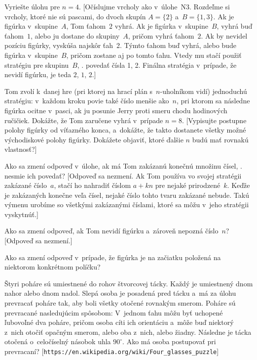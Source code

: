 {Vyriešte úlohu pre $n = 4$. [Očíslujme vrcholy ako
v~úlohe~N3. Rozdeľme si vrcholy, ktoré nie sú pascami, do dvoch skupín $A= \{2\}$
a~$B = \{1, 3\}$. Ak je figúrka v~skupine~$A$, Tom ťahom~$2$ vyhrá.
Ak je figúrka v~skupine~$B$, vyhrá buď ťahom~$1$, alebo ju
dostane do skupiny~$A$, pričom vyhrá ťahom~$2$. Ak by nevidel pozíciu
figúrky, vyskúša najskôr ťah~2. Týmto ťahom buď vyhrá, alebo
bude figúrka v~skupine~$B$, pričom zostane aj po tomto ťahu. Vtedy mu
stačí použiť stratégiu pre skupinu~$B$, \tj. povedať čísla
1, 2. Finálna stratégia v~prípade, že nevidí figúrku, je teda
$2$, $1$, $2$.]

Tom zvolí k~danej hre (pri ktorej na hrací plán s~$n$-uholníkom vidí)
jednoduchú stratégiu: v~každom kroku povie také číslo menšie ako~$n$,
pri ktorom sa následne figúrka ocitne v~pasci, ak ju posunie Jerry proti
smeru chodu hodinových ručičiek. Dokážte, že Tom zaručene vyhrá v~prípade $n=8$.
[Vypisujte postupne polohy figúrky
od víťazného konca,
a~dokážte, že takto dostanete všetky možné východiskové polohy figúrky.
Dokážete objaviť, ktoré ďalšie $n$ budú mať rovnakú vlastnosť?]

\D
Ako sa zmení odpoveď v~úlohe, ak má Tom zakázanú
konečnú množinu čísel, \tj. nesmie ich povedať? [Odpoveď sa
nezmení. Ak Tom používa vo svojej stratégii zakázané číslo~$a$,
stačí ho nahradiť číslom $a+kn$ pre nejaké prirodzené~$k$.
Keďže je zakázaných konečne veľa čísel, nejaké číslo
tohto tvaru zakázané nebude. Takú výmenu urobíme so všetkými
zakázanými číslami, ktoré sa môžu v~jeho stratégii vyskytnúť.]

Ako sa zmení odpoveď, ak Tom nevidí figúrku
a~zároveň nepozná číslo~$n$? [Odpoveď sa nezmení.]

Ako sa zmení odpoveď v~prípade, že figúrka je na
začiatku položená na niektorom konkrétnom políčku?

Štyri poháre sú umiestnené do rohov štvorcovej tácky.
Každý je umiestnený dnom nahor alebo dnom nadol. Slepá osoba je
posadená pred tácku a~má za úlohu prevracať poháre tak, aby boli
všetky otočené rovnakým smerom. Poháre sú prevracané nasledujúcim
spôsobom: V~jednom ťahu môžu byť uchopené ľubovoľné dva poháre,
pričom osoba cíti ich
orientáciu a~môže buď niektorý z~nich otočiť opačným smerom,
alebo oba z~nich, alebo žiadny. Následne je tácka otočená
o~celočíselný násobok uhla $90^\circ$. Ako má osoba postupovať pri
prevracaní? [\hbox{\tt https://en.wikipedia.org/wiki/Four\_glasses\_puzzle}]
}

